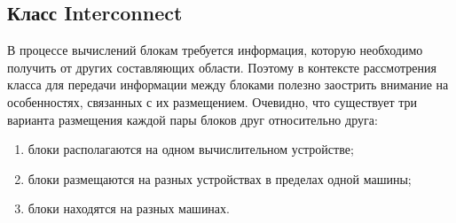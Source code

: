 \documentclass[a4paper, 14pt]{extarticle}
\theoremstyle{definition}
\begin{document}

\subsection{Класс Interconnect}


\par В процессе вычислений блокам требуется информация, которую необходимо получить от других составляющих области. Поэтому в контексте рассмотрения класса для передачи информации между блоками полезно заострить внимание на особенностях, связанных с их размещением. Очевидно, что существует три варианта размещения каждой пары блоков друг относительно друга:
\begin{enumerate}
\item блоки располагаются на одном вычислительном устройстве;
\item блоки размещаются на разных устройствах в пределах одной машины;
\item блоки находятся на разных машинах.
\end{enumerate}
\end{document}
